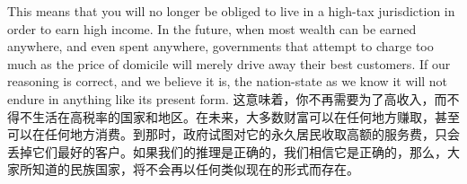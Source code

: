 \begin{paracol}{2}[]
\switchcolumn*
This means that you will no longer be obliged to live in a high-tax jurisdiction in order to earn high income. In the future, when most wealth can be earned anywhere, and even spent anywhere, governments that attempt to charge too much as the price of domicile will merely drive away their best customers. If our reasoning is correct, and we believe it is, the nation-state as we know it will not endure in anything like its present form.
\switchcolumn
这意味着，你不再需要为了高收入，而不得不生活在高税率的国家和地区。在未来，大多数财富可以在任何地方赚取，甚至可以在任何地方消费。到那时，政府试图对它的永久居民收取高额的服务费，只会丢掉它们最好的客户。如果我们的推理是正确的，我们相信它是正确的，那么，大家所知道的民族国家，将不会再以任何类似现在的形式而存在。
\end{paracol}

